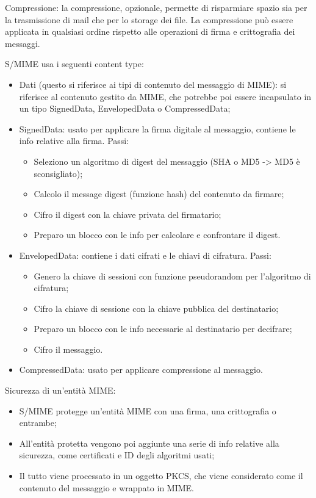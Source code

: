 Compressione: la compressione, opzionale, permette di risparmiare spazio sia per la trasmissione di mail che per lo storage dei file. La compressione può essere applicata in qualsiasi ordine rispetto alle operazioni di firma e crittografia dei messaggi. 

S/MIME usa i seguenti content type:
\begin{itemize}
    \item Dati (questo si riferisce ai tipi di contenuto del messaggio di MIME): si riferisce al contenuto gestito da MIME, che potrebbe poi essere incapsulato in un tipo SignedData, EnvelopedData o CompressedData;
	\item SignedData: usato per applicare la firma digitale al messaggio, contiene le info relative alla firma. Passi:
	\begin{itemize}
	    \item Seleziono un algoritmo di digest del messaggio (SHA o MD5 -> MD5 è sconsigliato);
		\item Calcolo il message digest (funzione hash) del contenuto da firmare;
		\item Cifro il digest con la chiave privata del firmatario;
		\item Preparo un blocco con le info per calcolare e confrontare il digest.
	\end{itemize}
	\item EnvelopedData: contiene i dati cifrati e le chiavi di cifratura. Passi:
	\begin{itemize}
	    \item Genero la chiave di sessioni con funzione pseudorandom per l'algoritmo di cifratura;
		\item Cifro la chiave di sessione con la chiave pubblica del destinatario;
		\item Preparo un blocco con le info necessarie al destinatario per decifrare;
		\item Cifro il messaggio.
	\end{itemize}
	\item CompressedData: usato per applicare compressione al messaggio.
\end{itemize}

Sicurezza di un'entità MIME:
\begin{itemize}
    \item S/MIME protegge un'entità MIME con una firma, una crittografia o entrambe;
	\item All'entità protetta vengono poi aggiunte una serie di info relative alla sicurezza, come certificati e ID degli algoritmi usati;
	\item Il tutto viene processato in un oggetto PKCS, che viene considerato come il contenuto del messaggio e wrappato in MIME.
\end{itemize}

